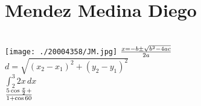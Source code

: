 \chapter{Mendez Medina Diego}
\\
\texttt{[image: ./20004358/JM.jpg]}
${ x= {-b \pm \sqrt{ b^2 - 4ac}  } \over 2a }$
\\
$ { d= \sqrt{ {(x_2 - x_1)}^{2} + {(y_{2} - y_1)}^{2} }}$
\\
${  \int_2^3 2x\, dx }$
\\
${ 5 \cos{ \pi  \over 2} +   \over 1 + \cos{60} }$
\\
